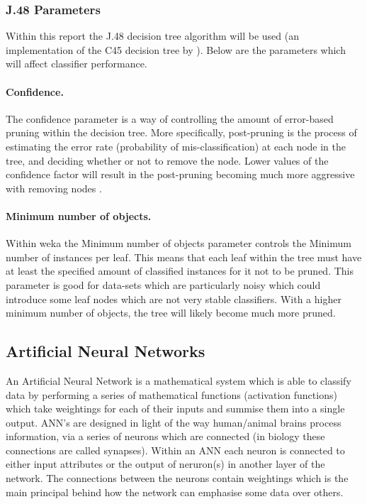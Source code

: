 \documentclass[12pt]{article}
\begin{document}
    \subsubsection{J.48 Parameters}
      Within this report the J.48 decision tree algorithm will be used (an implementation of the C45 decision tree by \cite{quinlan2014c4}). Below are the parameters which will affect classifier performance.

      \paragraph{Confidence.}
        The confidence parameter is a way of controlling the amount of error-based pruning \citep{quinlan1987simplifying} within the decision tree. More specifically, post-pruning is the process of estimating the error rate (probability of mis-classification) at each node in the tree, and deciding whether or not to remove the node. Lower values of the confidence factor will result in the post-pruning becoming much more aggressive with removing nodes \citep{beck2008backward}.

      \paragraph{Minimum number of objects.}
        Within weka the Minimum number of objects parameter controls the Minimum number of instances per leaf. This means that each leaf within the tree must have at least the specified amount of classified instances for it not to be pruned. This parameter is good for data-sets which are particularly noisy which could introduce some leaf nodes which are not very stable classifiers. With a higher minimum number of objects, the tree will likely become much more pruned.


  \subsection{Artificial Neural Networks} \label{ann}
    An Artificial Neural Network is a mathematical system which is able to classify data by performing a series of mathematical functions (activation functions) which take weightings for each of their inputs and summise them into a single output. ANN's are designed in light of the way human/animal brains process information, via a series of neurons which are connected (in biology these connections are called synapses). Within an ANN each neuron is connected to either input attributes or the output of neruron(s) in another layer of the network. The connections between the neurons contain weightings which is the main principal behind how the network can emphasise some data over others.
\end{document}
